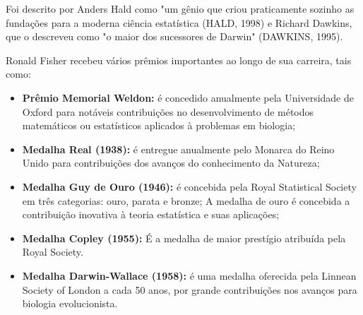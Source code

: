 Foi descrito por Anders Hald como "um gênio que criou praticamente sozinho as fundações para a moderna ciência estatística (HALD, 1998) e Richard Dawkins, que o descreveu como "o maior dos sucessores de Darwin" (DAWKINS, 1995).\vskip0.3cm


\newpage
Ronald Fisher recebeu vários prêmios importantes ao longo de sua carreira, tais como:

\begin{itemize}
    \item \textbf{Prêmio Memorial Weldon:} é concedido anualmente pela Universidade de Oxford para notáveis contribuições no desenvolvimento de métodos matemáticos ou estatísticos aplicados à problemas em biologia; 
    \item \textbf{Medalha Real (1938):} é entregue anualmente pelo Monarca do Reino Unido para contribuições dos avanços do conhecimento da Natureza;
    \item \textbf{Medalha Guy de Ouro (1946):} é concebida pela Royal Statistical Society em três categorias: ouro, parata e bronze; A medalha de ouro é concebida a contribuição inovativa à teoria estatística e suas aplicações;
    \item \textbf{Medalha Copley (1955):} É a medalha de maior prestígio atribuída pela Royal Society.
    \item \textbf{Medalha Darwin-Wallace (1958):} é uma medalha oferecida pela Linnean Society of London a cada 50 anos, por grande contribuições nos avanços para biologia evolucionista.
\end{itemize}


